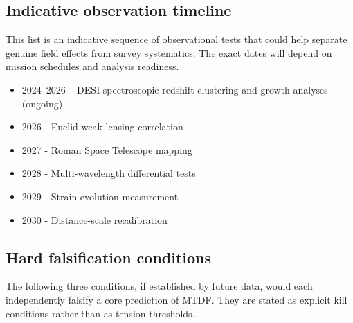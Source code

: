 \documentclass[11pt,a4paper]{article}
\begin{document}
\subsection{Indicative observation timeline}
This list is an indicative sequence of observational tests that could help separate genuine field effects from survey systematics. The exact dates will depend on mission schedules and analysis readiness.

\begin{itemize}
  \item 2024--2026 -- DESI spectroscopic redshift clustering and growth analyses (ongoing)
  \item 2026 - Euclid weak-lensing correlation
  \item 2027 - Roman Space Telescope mapping
  \item 2028 - Multi-wavelength differential tests
  \item 2029 - Strain-evolution measurement
  \item 2030 - Distance-scale recalibration
\end{itemize}

\subsection{Hard falsification conditions}
The following three conditions, if established by future data, would each independently falsify a core prediction of MTDF. They are stated as explicit kill conditions rather than as tension thresholds.
\end{document}
